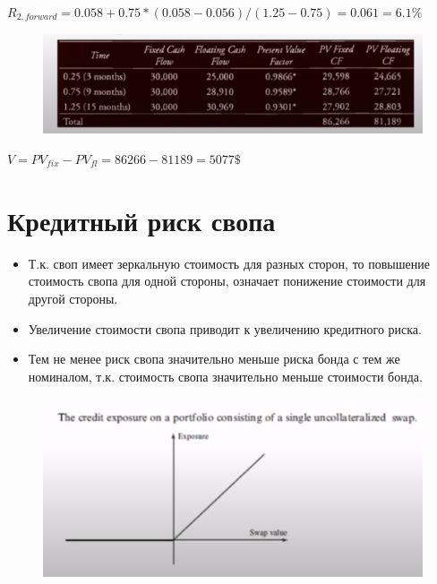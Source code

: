 \documentclass{article}
\begin{document}
$R_{2, forward} = 0.058 + 0.75*(0.058 - 0.056)/(1.25 - 0.75) = 0.061 = 6.1\%$

\begin{figure}[h]
\centering
\includegraphics{fra approach.png}
\label{loadings}
\end{figure}

\text{}

\text{}
$V = PV_{fix} - PV_{fl} = 86266 - 81189 = 5077 \$ $

\section{Кредитный риск свопа}

\begin{itemize}
    \item Т.к. своп имеет зеркальную стоимость для разных сторон, то повышение стоимость свопа для одной стороны, означает понижение стоимости для другой стороны.
    \item Увеличение стоимости свопа приводит к увеличению кредитного риска.
    \item Тем не менее риск свопа значительно меньше риска бонда с тем же номиналом, т.к. стоимость свопа значительно меньше стоимости бонда.
\end{itemize}

\begin{figure}[h]
\centering
\includegraphics{credit risk.png}
\label{loadings}
\end{figure}

\newpage
\end{document}
